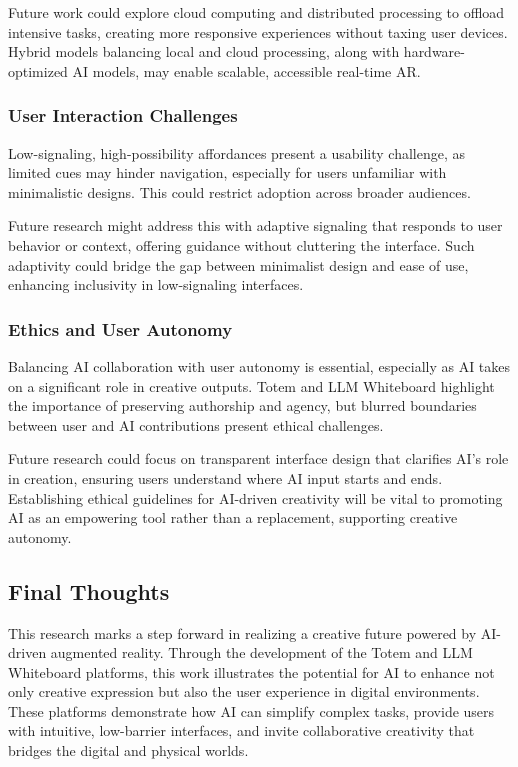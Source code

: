Future work could explore cloud computing and distributed processing to offload intensive tasks, creating more responsive experiences without taxing user devices.
Hybrid models balancing local and cloud processing, along with hardware-optimized AI models, may enable scalable, accessible real-time AR.

\subsubsection{User Interaction Challenges}
Low-signaling, high-possibility affordances present a usability challenge, as limited cues may hinder navigation, especially for users unfamiliar with minimalistic designs.
This could restrict adoption across broader audiences.

Future research might address this with adaptive signaling that responds to user behavior or context, offering guidance without cluttering the interface.
Such adaptivity could bridge the gap between minimalist design and ease of use, enhancing inclusivity in low-signaling interfaces.

\subsubsection{Ethics and User Autonomy}
Balancing AI collaboration with user autonomy is essential, especially as AI takes on a significant role in creative outputs.
Totem and LLM Whiteboard highlight the importance of preserving authorship and agency, but blurred boundaries between user and AI contributions present ethical challenges.

Future research could focus on transparent interface design that clarifies AI’s role in creation, ensuring users understand where AI input starts and ends.
Establishing ethical guidelines for AI-driven creativity will be vital to promoting AI as an empowering tool rather than a replacement, supporting creative autonomy.

\subsection{Final Thoughts}

This research marks a step forward in realizing a creative future powered by AI-driven augmented reality.
Through the development of the Totem and LLM Whiteboard platforms, this work illustrates the potential for AI to enhance not only creative expression but also the user experience in digital environments.
These platforms demonstrate how AI can simplify complex tasks, provide users with intuitive, low-barrier interfaces, and invite collaborative creativity that bridges the digital and physical worlds.

